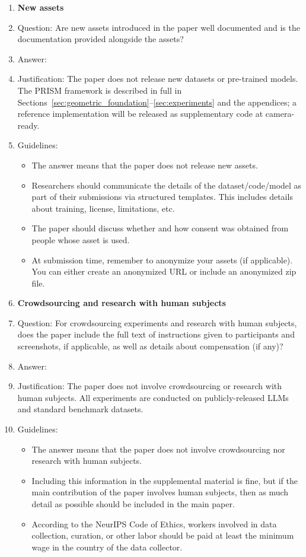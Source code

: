\begin{enumerate}
\item {\bf New assets}
    \item[] Question: Are new assets introduced in the paper well documented and is the documentation provided alongside the assets?
    \item[] Answer: \answerNA{}
    \item[] Justification: The paper does not release new datasets or pre-trained models. The PRISM framework is described in full in Sections~\ref{sec:geometric_foundation}--\ref{sec:experiments} and the appendices; a reference implementation will be released as supplementary code at camera-ready.
    \item[] Guidelines:
    \begin{itemize}
        \item The answer \answerNA{} means that the paper does not release new assets.
        \item Researchers should communicate the details of the dataset\slash code\slash model as part of their submissions via structured templates. This includes details about training, license, limitations, etc.
        \item The paper should discuss whether and how consent was obtained from people whose asset is used.
        \item At submission time, remember to anonymize your assets (if applicable). You can either create an anonymized URL or include an anonymized zip file.
    \end{itemize}

\item {\bf Crowdsourcing and research with human subjects}
    \item[] Question: For crowdsourcing experiments and research with human subjects, does the paper include the full text of instructions given to participants and screenshots, if applicable, as well as details about compensation (if any)?
    \item[] Answer: \answerNA{}
    \item[] Justification: The paper does not involve crowdsourcing or research with human subjects. All experiments are conducted on publicly-released LLMs and standard benchmark datasets.
    \item[] Guidelines:
    \begin{itemize}
        \item The answer \answerNA{} means that the paper does not involve crowdsourcing nor research with human subjects.
        \item Including this information in the supplemental material is fine, but if the main contribution of the paper involves human subjects, then as much detail as possible should be included in the main paper.
        \item According to the NeurIPS Code of Ethics, workers involved in data collection, curation, or other labor should be paid at least the minimum wage in the country of the data collector.
    \end{itemize}


\end{enumerate}
